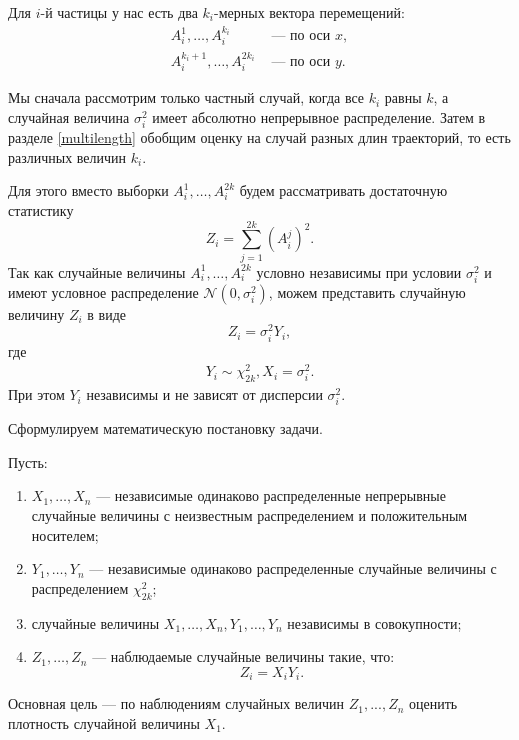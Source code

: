 \documentclass[../paper.tex]{subfiles}
\begin{document}
Для $i$-й частицы у нас есть два $k_i$-мерных вектора перемещений: 
\begin{align*}
	A_i^1, \dots, A_i^{k_i} &\text{ --- по оси } x, \\
	A_i^{k_i+1}, \dots, A_i^{2k_i} &\text{ --- по оси } y
.\end{align*}

Мы сначала рассмотрим только частный случай,
когда все $k_i$ равны $k$, а случайная величина $\sigma_i^2$ имеет абсолютно непрерывное распределение.
Затем в разделе \ref{multilength} обобщим оценку на случай разных длин траекторий, то есть различных величин $k_i$.

Для этого вместо выборки $A_i^1, \dots, A_i^{2k}$ будем рассматривать
достаточную статистику 
\[
	Z_i = \sum\limits_{j=1}^{2k} \left(A_i^j\right)^2
.\]
Так как случайные величины $A_i^1, \dots, A_i^{2k}$ условно независимы при условии $\sigma_i^2$ и имеют условное
распределение $\mathcal{N}\left(0, \sigma_i^2\right)$, можем представить случайную величину $Z_i$ в виде
\[
Z_i = \sigma_i^2 Y_i,
\]
где 
\begin{align*}
	Y_i \sim \chi^2_{2k},
	X_i = \sigma_i^2
.\end{align*}
При этом $Y_i$ независимы и не зависят от дисперсии $\sigma_i^2$.

Сформулируем математическую постановку задачи.

\begin{Probl}\label{problem}
	Пусть:
	\begin{enumerate}
		\item $X_1, \dots, X_n$ --- независимые одинаково распределенные непрерывные случайные величины
			с неизвестным распределением и положительным носителем; 
		\item $Y_1, \dots, Y_n$ --- независимые одинаково распределенные случайные величины с распределением $\chi^2_{2k}$;
		\item случайные величины $X_1, \dots, X_n, Y_1, \dots, Y_n$ независимы в совокупности;
		\item $Z_1, \dots, Z_n$ --- наблюдаемые случайные величины такие, что:
			\[
				Z_i = X_i Y_i
			.\]
	\end{enumerate}
	Основная цель --- по наблюдениям случайных величин $Z_1, ..., Z_n$ оценить плотность случайной величины $X_1$.
\end{Probl}
\end{document}
